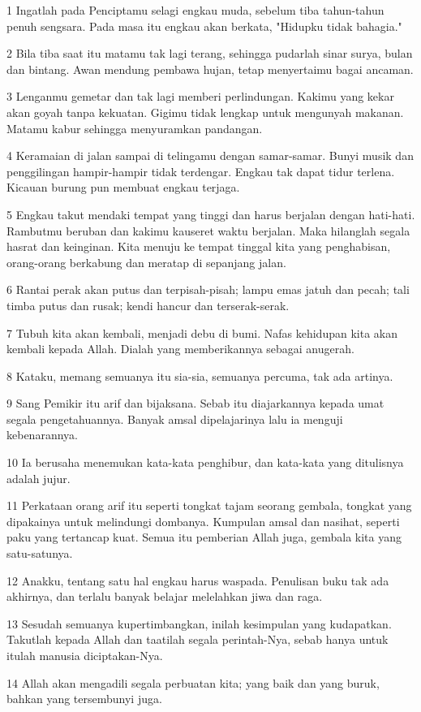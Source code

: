 \par 1 Ingatlah pada Penciptamu selagi engkau muda, sebelum tiba tahun-tahun penuh sengsara. Pada masa itu engkau akan berkata, "Hidupku tidak bahagia."
\par 2 Bila tiba saat itu matamu tak lagi terang, sehingga pudarlah sinar surya, bulan dan bintang. Awan mendung pembawa hujan, tetap menyertaimu bagai ancaman.
\par 3 Lenganmu gemetar dan tak lagi memberi perlindungan. Kakimu yang kekar akan goyah tanpa kekuatan. Gigimu tidak lengkap untuk mengunyah makanan. Matamu kabur sehingga menyuramkan pandangan.
\par 4 Keramaian di jalan sampai di telingamu dengan samar-samar. Bunyi musik dan penggilingan hampir-hampir tidak terdengar. Engkau tak dapat tidur terlena. Kicauan burung pun membuat engkau terjaga.
\par 5 Engkau takut mendaki tempat yang tinggi dan harus berjalan dengan hati-hati. Rambutmu beruban dan kakimu kauseret waktu berjalan. Maka hilanglah segala hasrat dan keinginan. Kita menuju ke tempat tinggal kita yang penghabisan, orang-orang berkabung dan meratap di sepanjang jalan.
\par 6 Rantai perak akan putus dan terpisah-pisah; lampu emas jatuh dan pecah; tali timba putus dan rusak; kendi hancur dan terserak-serak.
\par 7 Tubuh kita akan kembali, menjadi debu di bumi. Nafas kehidupan kita akan kembali kepada Allah. Dialah yang memberikannya sebagai anugerah.
\par 8 Kataku, memang semuanya itu sia-sia, semuanya percuma, tak ada artinya.
\par 9 Sang Pemikir itu arif dan bijaksana. Sebab itu diajarkannya kepada umat segala pengetahuannya. Banyak amsal dipelajarinya lalu ia menguji kebenarannya.
\par 10 Ia berusaha menemukan kata-kata penghibur, dan kata-kata yang ditulisnya adalah jujur.
\par 11 Perkataan orang arif itu seperti tongkat tajam seorang gembala, tongkat yang dipakainya untuk melindungi dombanya. Kumpulan amsal dan nasihat, seperti paku yang tertancap kuat. Semua itu pemberian Allah juga, gembala kita yang satu-satunya.
\par 12 Anakku, tentang satu hal engkau harus waspada. Penulisan buku tak ada akhirnya, dan terlalu banyak belajar melelahkan jiwa dan raga.
\par 13 Sesudah semuanya kupertimbangkan, inilah kesimpulan yang kudapatkan. Takutlah kepada Allah dan taatilah segala perintah-Nya, sebab hanya untuk itulah manusia diciptakan-Nya.
\par 14 Allah akan mengadili segala perbuatan kita; yang baik dan yang buruk, bahkan yang tersembunyi juga.


